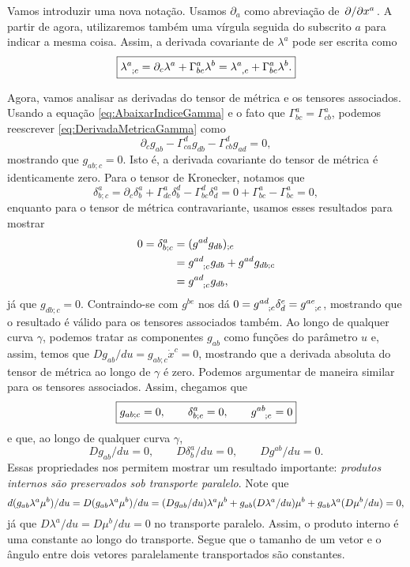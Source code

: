 Vamos introduzir uma nova notação. Usamos $\partial _a$ como abreviação de $\pdv*{x^a}$. A partir de agora, utilizaremos também uma vírgula seguida do subscrito $a$ para indicar a mesma coisa. Assim, a derivada covariante de $\lambda^a$ pode ser escrita como
\begin{equation}
	\boxed{
		\tensor{\lambda}{^a_{;c}}=\partial_c\lambda^a+\Gamma^a_{bc}\lambda^b = 
		\tensor{\lambda}{^a_{,c}}+\Gamma^a_{bc}\lambda^b .
	}
\end{equation}

Agora, vamos analisar as derivadas do tensor de métrica e os tensores associados. Usando a equação \eqref{eq:AbaixarIndiceGamma} e o fato que $\Gamma^a_{bc}=\Gamma^a_{cb}$, podemos reescrever \eqref{eq:DerivadaMetricaGamma} como
\[
	\partial_c g_{ab}-\Gamma^d_{ca}g_{db}-\Gamma^d_{cb}g_{ad}=0,
\]
mostrando que $g_{ab;c}=0$. Isto é, a derivada covariante do tensor de métrica é identicamente zero. Para o tensor de Kronecker, notamos que
\[
	\delta^a_{b;c}=\partial_c\delta^a_b+\Gamma^a_{dc}\delta^d_b-\Gamma^d_{bc}\delta^a_d=0+\Gamma^a_{bc}-\Gamma ^a_{bc}=0,
\]
enquanto para o tensor de métrica contravariante, usamos esses resultados para mostrar
\begin{align*}
	0 = \delta^a_{b;c} &= (g^{ad}g_{db})_{;c} \\
	&= \tensor{g}{^a^d_{;c}}g_{db}+g^{ad}g_{db;c} \\
	&= \tensor{g}{^a^d_{;c}}g_{db} ,
\end{align*}
já que $g_{db;c}=0$. Contraindo-se com $g^{be}$ nos dá $0=\tensor{g}{^a^d_{;c}}\delta^e_d=\tensor{g}{^a^e_{;c}}$, mostrando que o resultado é válido para os tensores associados também. Ao longo de qualquer curva $\gamma$, podemos tratar as componentes $g_{ab}$ como funções do parâmetro $u$ e, assim, temos que $Dg_{ab}/du=g_{ab;c}\dot{x}^c=0$, mostrando que a derivada absoluta do tensor de métrica ao longo de $\gamma$ é zero. Podemos argumentar de maneira similar para os tensores associados. Assim, chegamos que
\begin{equation}\label{eq:DerivadaCovarianteMetrica}
	\boxed{
	g_{ab;c}=0, \qquad \delta^a_{b;c}=0, \qquad \tensor{g}{^a^b_{;c}}=0
	}
\end{equation}
e que, ao longo de qualquer curva $\gamma$,
\begin{equation}
	\boxed{
	Dg_{ab}/du=0, \qquad D\delta^a_b/du=0, \qquad Dg^{ab}/du=0.
	}
\end{equation}
Essas propriedades nos permitem mostrar um resultado importante: \textit{produtos internos são preservados sob transporte paralelo}. Note que
\[
d(g_{ab}\lambda^a\mu^b)/du = D(g_{ab}\lambda^a\mu^b)/du	\\
= (Dg_{ab}/du)\lambda^a\mu^b + g_{ab}(D\lambda^a/du)\mu^b+g_{ab}\lambda^a(D\mu^b/du)=0,
\]
já que $D\lambda^a/du=D\mu^b/du=0$ no transporte paralelo. Assim, o produto interno é uma constante ao longo do transporte. Segue que o tamanho de um vetor  e o ângulo entre dois vetores paralelamente transportados são constantes.

